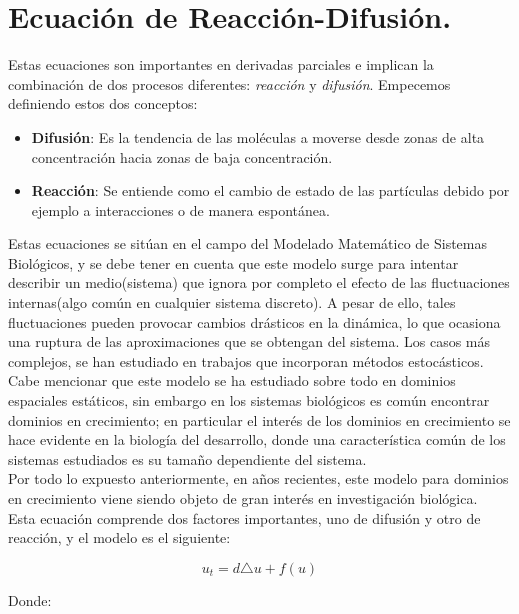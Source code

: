 \section{Ecuación de Reacción-Difusión.}\label{cap: Ec Re Dif}
Estas ecuaciones son importantes en derivadas parciales e implican la combinación de dos procesos diferentes: \textit{reacción} y \textit{difusión}. Empecemos definiendo estos dos conceptos:
\begin{itemize}
	\item \textbf{Difusión}: Es la tendencia de las moléculas a moverse desde zonas de alta concentración hacia zonas de baja concentración.
	\item \textbf{Reacción}: Se entiende como el cambio de estado de las partículas debido por ejemplo a interacciones o de manera espontánea.
\end{itemize}
Estas ecuaciones se sitúan en el campo del Modelado Matemático de Sistemas Biológicos, y se debe tener en cuenta que este modelo surge para intentar describir un medio(sistema) que ignora por completo el efecto de las fluctuaciones internas(algo común en cualquier sistema discreto). A pesar de ello, tales fluctuaciones pueden provocar cambios drásticos en la dinámica, lo que ocasiona una ruptura de las aproximaciones que se obtengan del sistema. Los casos más complejos, se han estudiado en trabajos que incorporan métodos estocásticos.\\

Cabe mencionar que este modelo se ha estudiado sobre todo en dominios espaciales estáticos, sin embargo en los sistemas biológicos es común encontrar dominios en crecimiento; en particular el interés de los dominios en crecimiento se hace evidente en la biología del desarrollo, donde una característica común de los sistemas estudiados es su tamaño dependiente del sistema.\\

Por todo lo expuesto anteriormente, en años recientes, este modelo para dominios en crecimiento viene siendo objeto de gran interés en investigación biológica.\\

Esta ecuación comprende dos factores importantes, uno de difusión y otro de reacción, y el modelo es el siguiente:

\begin{equation}
	\label{ReaccionDifusion1}
	{ u }_{ t }=d\triangle u+f(u)
\end{equation}

\vspace{0.2cm}
Donde:

